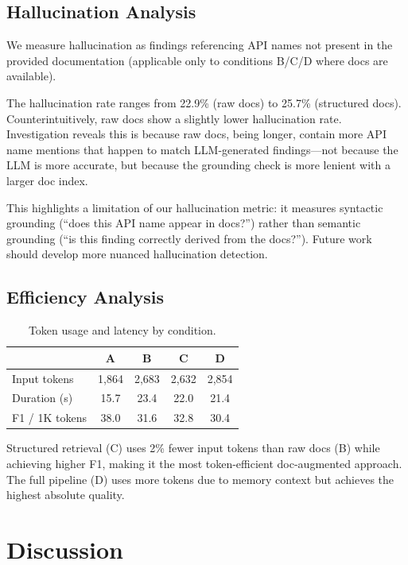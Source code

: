 \documentclass[sigconf,nonacm]{acmart}
\begin{document}
\subsection{Hallucination Analysis}

We measure hallucination as findings referencing API names not present in the provided documentation (applicable only to conditions B/C/D where docs are available).

The hallucination rate ranges from 22.9\% (raw docs) to 25.7\% (structured docs). Counterintuitively, raw docs show a slightly lower hallucination rate. Investigation reveals this is because raw docs, being longer, contain more API name mentions that happen to match LLM-generated findings---not because the LLM is more accurate, but because the grounding check is more lenient with a larger doc index.

This highlights a limitation of our hallucination metric: it measures syntactic grounding (``does this API name appear in docs?'') rather than semantic grounding (``is this finding correctly derived from the docs?''). Future work should develop more nuanced hallucination detection.

\subsection{Efficiency Analysis}

\begin{table}[h]
\centering
\caption{Token usage and latency by condition.}
\label{tab:efficiency}
\begin{tabular}{lcccc}
\hline
 & \textbf{A} & \textbf{B} & \textbf{C} & \textbf{D} \\
\hline
Input tokens & 1,864 & 2,683 & 2,632 & 2,854 \\
Duration (s) & 15.7 & 23.4 & 22.0 & 21.4 \\
F1 / 1K tokens & 38.0 & 31.6 & 32.8 & 30.4 \\
\hline
\end{tabular}
\end{table}

Structured retrieval (C) uses 2\% fewer input tokens than raw docs (B) while achieving higher F1, making it the most token-efficient doc-augmented approach. The full pipeline (D) uses more tokens due to memory context but achieves the highest absolute quality.

\section{Discussion}
\label{sec:discussion}
\end{document}
